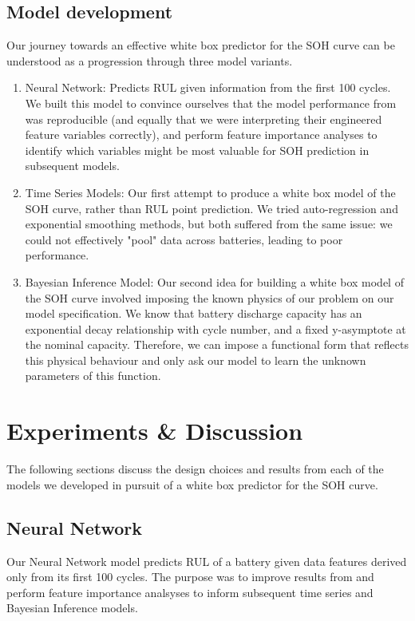 \documentclass{article}
\begin{document}
\subsection{Model development}
\label{mot}
Our journey towards an effective white box predictor for the SOH curve can be understood as a progression through three model variants. 
\begin{enumerate}[leftmargin=.35in]
    \item Neural Network: Predicts RUL given information from the first 100 cycles. We built this model to convince ourselves that the model performance from \cite{severson2019data} was reproducible (and equally that we were interpreting their engineered feature variables correctly), and perform feature importance analyses to identify which variables might be most valuable for SOH prediction in subsequent models.

    \item Time Series Models: Our first attempt to produce a white box model of the SOH curve, rather than RUL point prediction. We tried auto-regression and exponential smoothing methods, but both suffered from the same issue: we could not effectively "pool" data across batteries, leading to poor performance.

    \item Bayesian Inference Model: Our second idea for building a white box model of the SOH curve involved imposing the known physics of our problem on our model specification. We know that battery discharge capacity has an exponential decay relationship with cycle number, and a fixed y-asymptote at the nominal capacity. Therefore, we can impose a functional form that reflects this physical behaviour and only ask our model to learn the unknown parameters of this function.
\end{enumerate}

\section{Experiments \& Discussion}
The following sections discuss the design choices and results from each of the models we developed in pursuit of a white box predictor for the SOH curve. 

\subsection{Neural Network}
Our Neural Network model predicts RUL of a battery given data features derived only from its first 100 cycles. The purpose was to improve results from \cite{severson2019data} and perform feature importance analsyses to inform subsequent time series and Bayesian Inference models.
\end{document}
